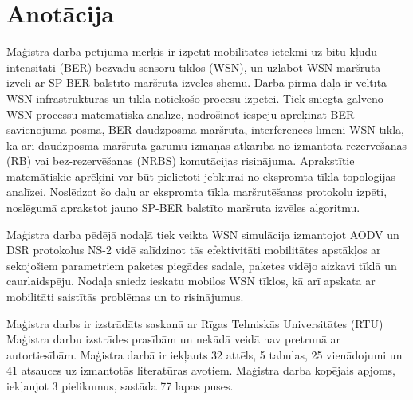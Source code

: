 \chapter{Anotācija}

Maģistra darba pētījuma mērķis ir izpētīt mobilitātes ietekmi uz bitu kļūdu intensitāti (BER) bezvadu sensoru tīklos (WSN), un uzlabot WSN maršrutā izvēli ar SP-BER balstīto maršruta izvēles shēmu.
Darba pirmā daļa ir veltīta WSN infrastruktūras un tīklā notiekošo procesu izpētei. Tiek sniegta galveno WSN processu matemātiskā analīze, nodrošinot iespēju aprēķināt BER savienojuma posmā, BER daudzposma maršrutā, interferences līmeni WSN tīklā, kā arī daudzposma maršruta garumu izmaņas atkarībā no izmantotā rezervēšanas (RB) vai bez-rezervēšanas (NRBS) komutācijas risinājuma. Aprakstītie matemātiskie aprēķini var būt pielietoti jebkurai no ekspromta tīkla topoloģijas analīzei. Noslēdzot šo daļu ar ekspromta tīkla  maršrutēšanas protokolu izpēti, noslēgumā aprakstot jauno SP-BER balstīto maršruta izvēles algoritmu.

Maģistra darba pēdējā nodaļā tiek veikta WSN simulācija izmantojot AODV un DSR protokolus NS-2 vidē salīdzinot tās efektivitāti mobilitātes apstākļos ar sekojošiem parametriem paketes piegādes sadale, paketes vidējo aizkavi tīklā un caurlaidspēju. Nodaļa sniedz ieskatu mobilos WSN tīklos, kā arī apskata ar mobilitāti saistītās problēmas un to risinājumus.

Maģistra darbs ir izstrādāts saskaņā ar Rīgas Tehniskās Universitātes (RTU) Maģistra darbu izstrādes prasībām un nekādā veidā nav pretrunā ar autortiesībām. Maģistra darbā ir iekļauts 32 attēls, 5 tabulas, 25 vienādojumi un 41 atsauces uz izmantotās literatūras avotiem. Maģistra darba kopējais apjoms, iekļaujot 3 pielikumus, sastāda 77 lapas puses.